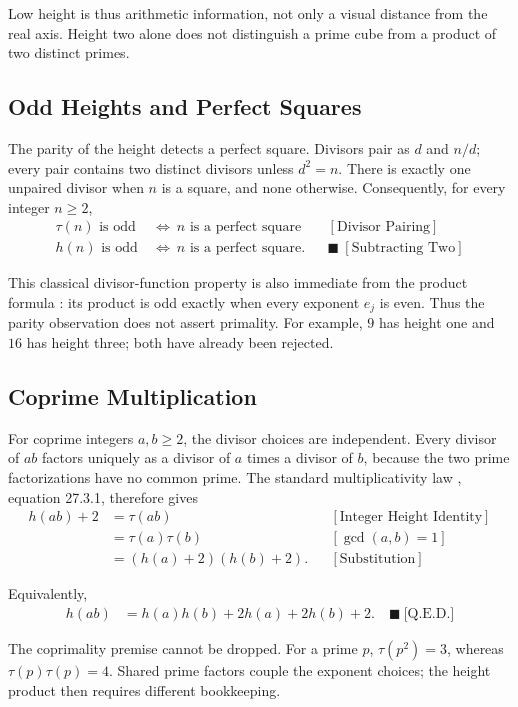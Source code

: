 Low height is thus arithmetic information, not only a visual distance from
the real axis. Height two alone does not distinguish a prime cube from a
product of two distinct primes.


\subsection{Odd Heights and Perfect Squares}

The parity of the height detects a perfect square. Divisors pair as $d$ and
$n/d$; every pair contains two distinct divisors unless $d^2=n$. There is
exactly one unpaired divisor when $n$ is a square, and none otherwise.
Consequently, for every integer $n\ge2$,
\begin{equation*}
\begin{aligned}
\tau(n)\text{ is odd}
&\ \Longleftrightarrow\ n\text{ is a perfect square}
&&[\text{Divisor Pairing}]\\
h(n)\text{ is odd}
&\ \Longleftrightarrow\ n\text{ is a perfect square}.
&&\blacksquare\ [\text{Subtracting Two}]
\end{aligned}
\end{equation*}

This classical divisor-function property is also immediate from the product
formula \cite{dlmfdivisors}: its product is odd exactly when every exponent $e_j$
is even. Thus the parity observation does not assert primality. For example,
$9$ has height one and $16$ has height three; both have already been rejected.


\subsection{Coprime Multiplication}

For coprime integers $a,b\ge2$, the divisor choices are independent. Every
divisor of $ab$ factors uniquely as a divisor of $a$ times a divisor of $b$,
because the two prime factorizations have no common prime. The standard
multiplicativity law \cite{dlmfdivisors}, equation 27.3.1, therefore gives
\begin{equation*}
\begin{aligned}
h(ab)+2&=\tau(ab)
&&[\text{Integer Height Identity}]\\
&=\tau(a)\tau(b)
&&[\gcd(a,b)=1]\\
&=(h(a)+2)(h(b)+2).
&&[\text{Substitution}]
\end{aligned}
\end{equation*}

Equivalently,
\begin{equation*}
\begin{aligned}
h(ab)&=h(a)h(b)+2h(a)+2h(b)+2.
\quad\blacksquare\ \text{[Q.E.D.]}
\end{aligned}
\end{equation*}

The coprimality premise cannot be dropped. For a prime $p$,
$\tau(p^2)=3$, whereas $\tau(p)\tau(p)=4$. Shared prime factors couple the
exponent choices; the height product then requires different bookkeeping.
